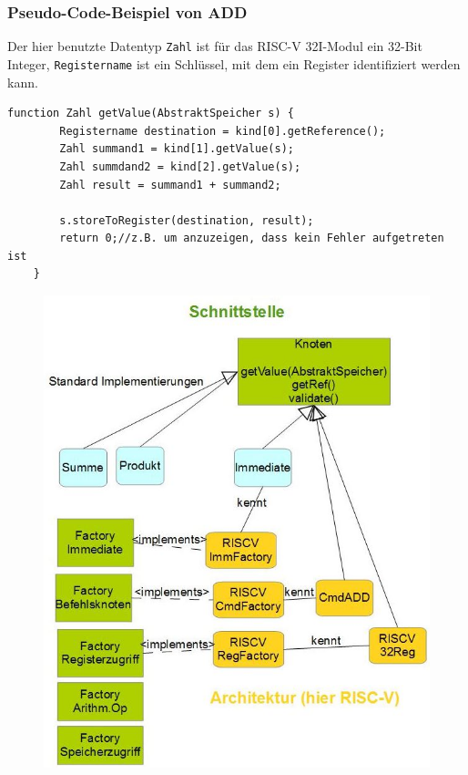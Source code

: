 \subsubsection{Pseudo-Code-Beispiel von ADD}
Der hier benutzte Datentyp \texttt{Zahl} ist für das RISC-V 32I-Modul ein 32-Bit Integer, \texttt{Registername} ist ein Schlüssel, mit dem ein Register identifiziert werden kann.
\begin{lstlisting}[style=C++]
	function Zahl getValue(AbstraktSpeicher s) {
		Registername destination = kind[0].getReference();
		Zahl summand1 = kind[1].getValue(s);
		Zahl summdand2 = kind[2].getValue(s);
		Zahl result = summand1 + summand2;

		s.storeToRegister(destination, result);
		return 0;//z.B. um anzuzeigen, dass kein Fehler aufgetreten ist
	}
\end{lstlisting}
\begin{figure}[h!]
\centering
\includegraphics[scale=0.5]{../arch/figures/zeichnung}
\end{figure}

